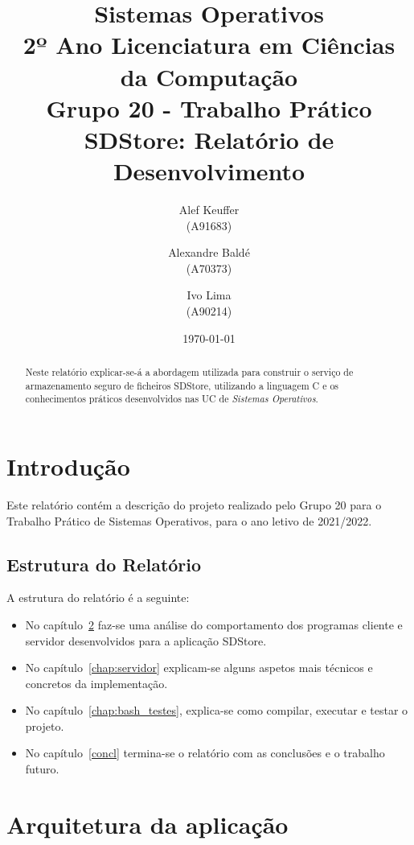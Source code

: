 \documentclass[11pt,a4paper]{report}%
\title{Sistemas Operativos\\
      2º Ano Licenciatura em Ciências da Computação \\
      \textbf{Grupo 20 - Trabalho Prático}\\ SDStore: Relatório de Desenvolvimento
      } %
\author{Alef Keuffer\\ (A91683) \and Alexandre Baldé\\ (A70373)
         \and Ivo Lima\\ (A90214)
       } %
\date{\today} %
\def\so{\emph{Sistemas Operativos}\xspace}
\begin{document}
\maketitle %

\begin{abstract}  %
Neste relatório explicar-se-á a abordagem utilizada para construir o serviço de
armazenamento seguro de ficheiros SDStore, utilizando a linguagem C e os conhecimentos
práticos desenvolvidos nas UC de \so.
\end{abstract}

\tableofcontents %
\listoffigures %

\chapter{Introdução} \label{chap:intro} %

Este relatório contém a descrição do projeto realizado pelo Grupo 20 para
o Trabalho Prático de Sistemas Operativos, para o ano letivo de 2021/2022.

\section*{Estrutura do Relatório}

A estrutura do relatório é a seguinte:
\begin{itemize}
\item No capítulo~\ref{chap:analysis} faz-se uma análise do comportamento dos
  programas cliente e servidor desenvolvidos para a aplicação SDStore.

\item No capítulo~\ref{chap:servidor} explicam-se alguns aspetos mais técnicos e concretos da implementação.

\item No capítulo~\ref{chap:bash_testes}, explica-se como compilar, executar e testar o projeto.

\item No capítulo~\ref{concl} termina-se o relatório com as conclusões e o trabalho futuro.
\end{itemize}

\chapter{Arquitetura da aplicação} \label{chap:analysis} %
\end{document}
